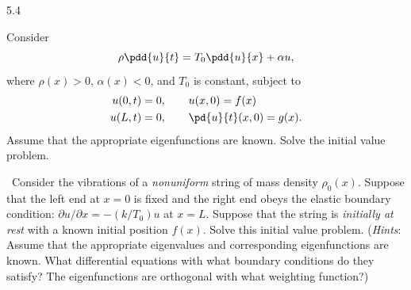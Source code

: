 \begin{exercises}{5.4}
\item Consider
\[
\rho\pdd{u}{t} = T_0\pdd{u}{x} + \alpha u,
\]
where $\rho(x) > 0$, $\alpha(x) < 0$, and $T_0$ is constant, subject to
\begin{align*}
u(0,t) &= 0, \qquad u(x,0) = f(x) \\
u(L,t) &= 0, \qquad \pd{u}{t}(x,0) = g(x).
\end{align*}
Assume that the appropriate eigenfunctions are known.  Solve the initial value problem.

\item\starred\ Consider the vibrations of a \textit{nonuniform} string of mass density $\rho_0(x)$.  Suppose that the left end at $x = 0$ is fixed and the right end obeys the elastic boundary condition: $\partial u/\partial x = -(k/T_0)u$ at $x = L$.  Suppose that the string is \textit{initially at rest} with a known initial position $f(x)$.  Solve this initial value problem.  (\textit{Hints}: Assume that the appropriate eigenvalues and corresponding eigenfunctions are known.  What differential equations with what boundary conditions do they satisfy?  The eigenfunctions are orthogonal with what weighting function?)

\end{exercises}

